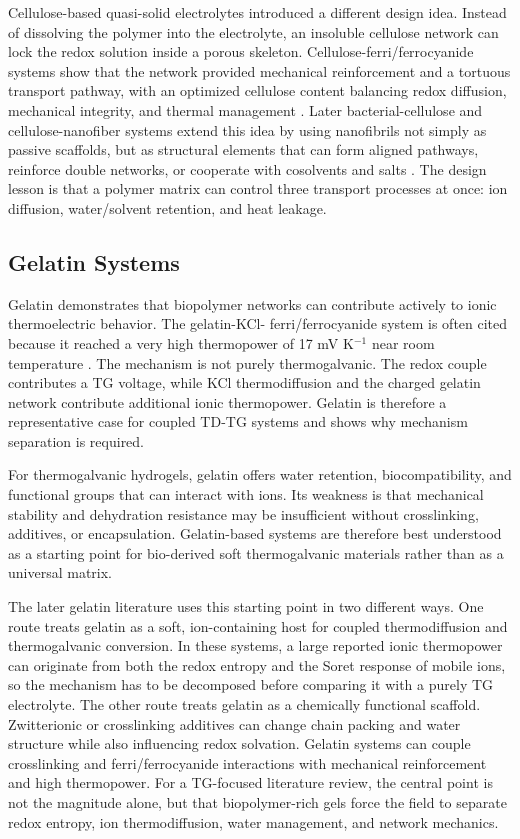 \documentclass[a4paper,12pt]{report}
\begin{document}
Cellulose-based quasi-solid electrolytes introduced a different design idea.
Instead of dissolving the polymer into the electrolyte, an insoluble cellulose
network can lock the redox solution inside a porous skeleton.
Cellulose-ferri/ferrocyanide systems show that the network
provided mechanical reinforcement and a tortuous transport pathway, with an
optimized cellulose content balancing redox diffusion, mechanical integrity, and
thermal management \citep{jin2016quasisolid}. Later bacterial-cellulose and
cellulose-nanofiber systems extend this idea by using nanofibrils not simply as
passive scaffolds, but as structural elements that can form aligned pathways,
reinforce double networks, or cooperate with cosolvents and salts
\citep{yin2023bacterial,lin2024triple}. The design lesson is that a polymer matrix can control
three transport processes at once: ion diffusion, water/solvent retention, and
heat leakage.

\subsection{Gelatin Systems}

Gelatin demonstrates that biopolymer networks can
contribute actively to ionic thermoelectric behavior. The gelatin-KCl-
ferri/ferrocyanide system is often cited because it reached a very high
thermopower of 17 mV K$^{-1}$ near room temperature \citep{han2020gelatin}.
The mechanism is not purely thermogalvanic. The redox couple contributes a TG
voltage, while KCl thermodiffusion and the charged gelatin network contribute
additional ionic thermopower. Gelatin is therefore a representative case for
coupled TD-TG systems and shows why mechanism separation is required.

For thermogalvanic hydrogels, gelatin offers water retention, biocompatibility,
and functional groups that can interact with ions. Its weakness is that
mechanical stability and dehydration resistance may be insufficient without
crosslinking, additives, or encapsulation. Gelatin-based systems are therefore
best understood as a starting point for bio-derived soft thermogalvanic
materials rather than as a universal matrix.

The later gelatin literature uses this starting point in two different ways.
One route treats gelatin as a soft, ion-containing host for coupled
thermodiffusion and thermogalvanic conversion. In these systems, a large
reported ionic thermopower can originate from both the redox entropy and the
Soret response of mobile ions, so the mechanism has to be decomposed before
comparing it with a purely TG electrolyte. The other route treats gelatin as a
chemically functional scaffold. Zwitterionic or crosslinking additives can
change chain packing and water structure while also influencing redox solvation.
Gelatin systems can couple crosslinking and ferri/ferrocyanide interactions
with mechanical reinforcement and high thermopower. For a TG-focused literature review, the
central point is not the magnitude alone, but that
biopolymer-rich gels force the field to separate redox entropy, ion
thermodiffusion, water management, and network mechanics.
\end{document}
